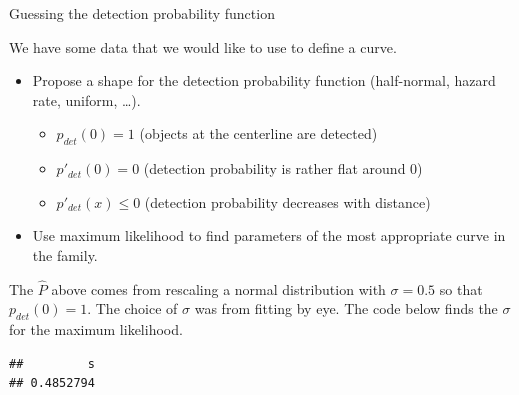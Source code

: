\documentclass[
  ignorenonframetext,
]{beamer}
\newenvironment{Shaded}{\begin{snugshade}}{\end{snugshade}}
\newcommand{\ControlFlowTok}[1]{\textcolor[rgb]{0.13,0.29,0.53}{\textbf{#1}}}
\newcommand{\DataTypeTok}[1]{\textcolor[rgb]{0.13,0.29,0.53}{#1}}
\newcommand{\DecValTok}[1]{\textcolor[rgb]{0.00,0.00,0.81}{#1}}
\newcommand{\FloatTok}[1]{\textcolor[rgb]{0.00,0.00,0.81}{#1}}
\newcommand{\KeywordTok}[1]{\textcolor[rgb]{0.13,0.29,0.53}{\textbf{#1}}}
\newcommand{\NormalTok}[1]{#1}
\newcommand{\OperatorTok}[1]{\textcolor[rgb]{0.81,0.36,0.00}{\textbf{#1}}}
\newcommand{\OtherTok}[1]{\textcolor[rgb]{0.56,0.35,0.01}{#1}}
\newcommand{\StringTok}[1]{\textcolor[rgb]{0.31,0.60,0.02}{#1}}
\providecommand{\tightlist}{%
  \setlength{\itemsep}{0pt}\setlength{\parskip}{0pt}}
\begin{document}
\begin{frame}[fragile]{Guessing the detection probability function}
\protect\hypertarget{guessing-the-detection-probability-function}{}

We have some data that we would like to use to define a curve.

\begin{itemize}
\tightlist
\item
  Propose a shape for the detection probability function (half-normal,
  hazard rate, uniform, \ldots).

  \begin{itemize}
  \tightlist
  \item
    \(p_{det}(0)=1\) (objects at the centerline are detected)
  \item
    \(p'_{det}(0)=0\) (detection probability is rather flat around 0)
  \item
    \(p'_{det}(x)\leq0\) (detection probability decreases with distance)
  \end{itemize}
\item
  Use maximum likelihood to find parameters of the most appropriate
  curve in the family.
\end{itemize}

The \(\hat P\) above comes from rescaling a normal distribution with
\(\sigma=0.5\) so that \(p_{det}(0)=1\). The choice of \(\sigma\) was
from fitting by eye. The code below finds the \(\sigma\) for the maximum
likelihood. \scriptsize

\begin{Shaded}
\end{Shaded}

\begin{verbatim}
##         s 
## 0.4852794
\end{verbatim}

\end{frame}
\end{document}
